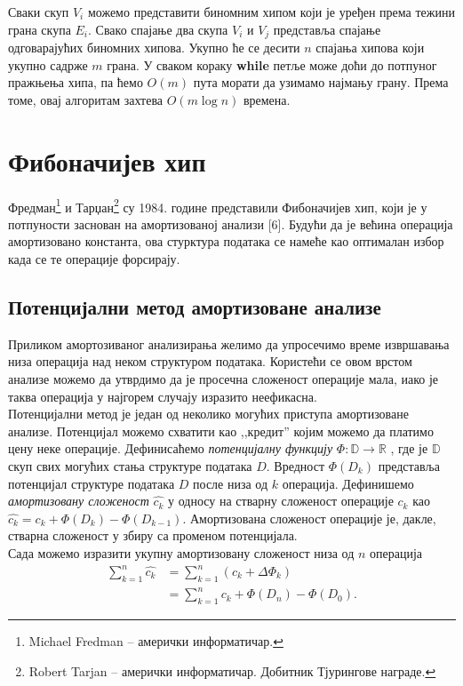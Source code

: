 \documentclass[11pt, a4paper]{article}
\theoremstyle{remark}
\numberwithin{equation}{section}
\begin{document}
	Сваки скуп $V_i$ можемо представити биномним хипом који је уређен према тежини грана скупа $E_i$. Свако спајање два скупа $V_i$ и $V_j$ представља спајање одговарајућих биномних хипова. Укупно ће се десити $n$ спајања хипова који укупно садрже $m$ грана. У сваком кораку \textbf{while} петље може доћи до потпуног пражњења хипа, па ћемо $O(m)$ пута морати да узимамо најмању грану. Према томе, овај алгоритам захтева $O(m \log n)$ времена.
	
	\newpage

	\section{Фибоначијев хип}
	
	Фредман\footnote{Michael Fredman -- амерички информатичар.} и Тарџан\footnote{Robert Tarjan -- амерички информатичар. Добитник Тјурингове награде.} су 1984. године представили Фибоначијев хип, који је у потпуности заснован на амортизованој анализи [6]. Будући да је већина операција амортизовано константа, ова стурктура података се намеће као оптималан избор када се те операције форсирају.
	
	\subsection*{Потенцијални метод амортизоване анализе}
	Приликом амортозиваног анализирања желимо да упросечимо време извршавања низа операција над неком структуром података. Користећи се овом врстом анализе можемо да утврдимо да је просечна сложеност операције мала, иако је таква операција у најгорем случају изразито неефикасна. \\
	
	\noindent Потенцијални метод је један од неколико могућих приступа амортизоване анализе. Потенцијал можемо схватити као ,,кредит'' којим можемо да платимо цену неке операције. Дефинисаћемо \textit{потенцијалну функцију} $\Phi : \mathbb{D} \rightarrow \mathbb{R}$ , где је $\mathbb{D}$ скуп свих могућих стања структуре података $D$. Вредност $\Phi (D_k)$ представља потенцијал структуре података $D$ после низа од $k$ операција. Дефинишемо \textit{амортизовану сложеност} $\hat{c_k}$ у односу на стварну сложеност операције $c_k$ као $\hat{c_k}=c_k+\Phi(D_k)-\Phi(D_{k-1})$. Амортизована сложеност операције је, дакле, стварна сложеност у збиру са променом потенцијала. \\
	
	\noindent  Сада можемо изразити укупну амортизовану сложеност низа од $n$ операција
	\begin{equation}
	\begin{split}
		\sum_{k=1}^{n} \hat{c_k} &= \sum_{k=1}^{n} (c_k+\Delta \Phi_k) \\
		&= \sum_{k=1}^{n} c_k + \Phi(D_n)-\Phi(D_0).
	\end{split}
	\end{equation}
	
\end{document}
